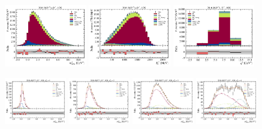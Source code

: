 \begin{figure}[!htb]
    \centering
    \includegraphics[width=0.32\textwidth]{./figs-fit-fit-results/ctrl-fit/stacked/fit_result-stacked-Dst-1os-mmiss2.pdf}
    \includegraphics[width=0.32\textwidth]{./figs-fit-fit-results/ctrl-fit/stacked/fit_result-stacked-Dst-1os-el.pdf}
    \includegraphics[width=0.32\textwidth]{./figs-fit-fit-results/ctrl-fit/stacked/fit_result-stacked-Dst-1os-q2.pdf}

    \includegraphics[width=0.24\textwidth]{./figs-fit-fit-results/ctrl-fit/lines_q2_slices/fit_result-lines_q2_idx1-Dst-1os-mmiss2.pdf}
    \includegraphics[width=0.24\textwidth]{./figs-fit-fit-results/ctrl-fit/lines_q2_slices/fit_result-lines_q2_idx2-Dst-1os-mmiss2.pdf}
    \includegraphics[width=0.24\textwidth]{./figs-fit-fit-results/ctrl-fit/lines_q2_slices/fit_result-lines_q2_idx3-Dst-1os-mmiss2.pdf}
    \includegraphics[width=0.24\textwidth]{./figs-fit-fit-results/ctrl-fit/lines_q2_slices/fit_result-lines_q2_idx4-Dst-1os-mmiss2.pdf}


\end{figure}
